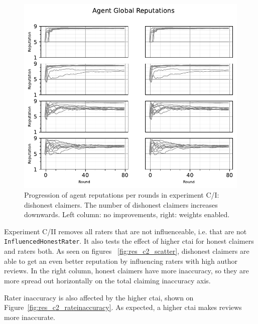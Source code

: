 \documentclass[%
    ]{\PathToTumTemplate/thesis/tum_thesis}
\begin{document}
\begin{figure}[tbp]
  \begin{center}
        \includegraphics[width=0.75\linewidth]	{../results/c/ReputationsPerRounds_joined.pdf}
    \caption{
 	Progression of agent reputations per rounds in experiment C/I: dishonest claimers.
    The number of dishonest claimers increases downwards.
    Left column: no improvements, right: weights enabled.
    }
    \label{fig:res_c_reps}
  \end{center}
\end{figure}

Experiment C/II removes all raters that are not influenceable, i.e. that are not \texttt{InfluencedHonestRater}.
It also tests the effect of higher \gls{ctai} for honest claimers and raters both.
As seen on figures ~\ref{fig:res_c2_scatter}, dishonest claimers are able to get an even better reputation by influencing raters with high author reviews.
In the right column, honest claimers have more inaccuracy, so they are more spread out horizontally on the total claiming inaccuracy axis.

Rater inaccuracy is also affected by the higher \gls{ctai}, shown on Figure~\ref{fig:res_c2_rateinaccuracy}.
As expected, a higher \gls{ctai} makes reviews more inaccurate.
\end{document}
